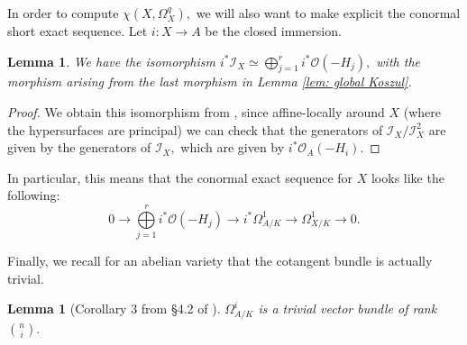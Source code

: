 \documentclass{article}
\newtheorem{lemma}[thm]{Lemma}
\theoremstyle{definition}
\theoremstyle{remark}
\begin{document}
In order to compute $\chi(X, \Omega_X^q),$ we will also want to make explicit the conormal short exact sequence. Let $i: X \rightarrow A$ be the closed immersion.
\begin{lemma}\label{lem: complete intersection conormal}
We have the isomorphism $i^*\mathcal{I}_X \simeq \bigoplus\limits_{j=1}^r i^*\mathcal{O}(-H_j),$ with the morphism arising from the last morphism in Lemma \ref{lem: global Koszul}. 
\end{lemma}
\begin{proof}
We obtain this isomorphism from \cite[Proposition 21.2.16]{vakil}, since affine-locally around $X$ (where the hypersurfaces are principal) we can check that the generators of $\mathcal{I}_X/\mathcal{I}_X^2$ are given by the generators of $\mathcal{I}_X,$ which are given by $i^*\mathcal{O}_A(-H_i).$ 
\end{proof}
\par In particular, this means that the conormal exact sequence for $X$ looks like the following:
\[0 \rightarrow \bigoplus\limits_{j=1}^r i^*\mathcal{O}(-H_j) \rightarrow i^*\Omega^1_{A/K} \rightarrow \Omega_{X/K}^1 \rightarrow 0.\]
\par Finally, we recall for an abelian variety that the cotangent bundle is actually trivial.
\begin{lemma}[Corollary 3 from \S 4.2 of \cite{BLR}]
$\Omega^i_{A/K}$ is a trivial vector bundle of rank $\binom{n}{i}.$
\end{lemma}
\end{document}
